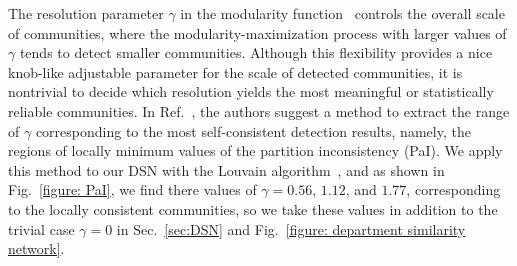 \documentclass{bmcart}
\begin{document}
\begin{appendices}
The resolution parameter $\gamma$ in the modularity function~\cite{Newman2004,Reichardt2004} controls the overall scale of communities, where the modularity-maximization process with larger values of $\gamma$ tends to detect smaller communities. Although this flexibility provides a nice knob-like adjustable parameter for the scale of detected communities, it is nontrivial to decide which resolution yields the most meaningful or statistically reliable communities. In Ref.~\cite{PhysRevE.103.052306}, the authors suggest a method to extract the range of $\gamma$ corresponding to the most self-consistent detection results, namely, the regions of locally minimum values of the partition inconsistency (PaI). We apply this method to our DSN with the Louvain algorithm~\cite{Blondel2008}, and as shown in Fig.~\ref{figure: PaI}, we find there values of $\gamma = 0.56$, $1.12$, and $1.77$, corresponding to the locally consistent communities, so we take these values in addition to the trivial case $\gamma = 0$ in Sec.~\ref{sec:DSN} and Fig.~\ref{figure: department similarity network}.

\end{appendices}
\newpage
\end{document}
